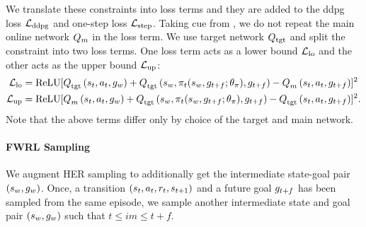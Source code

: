 We translate these constraints into loss terms and they are added to the
ddpg loss $\LossDDPG$ and one-step loss $\LossStep$.
Taking cue from \citet{MnKaSiNATURE2015}, we do
not repeat the main online network $\Q_{m}$ in the loss term. We use target
network $\Qtgt$ and split the constraint into two loss terms. One loss term acts
as a lower bound $\LossLo$ and the other acts as the upper bound $\LossUp$:
%
\begin{align}
  \LossLo &= \text{ReLU}[
      \fwargs{\state_{t}}{\act_t}{\goal_{w}}{\tgt}{}
      + \fwargs{\state_{w}}{\policy_t(\state_{w}, \goal_{t+f};\param_\policy)}{\goal_{t+f}}{\tgt}{}
      - \fwargs{\state_{t}}{\act_t}{\goal_{t+f}}{m}{}
      ]^2
                         \\
  \LossUp &= \text{ReLU}[
      \fwargs{\state_{t}}{\act_t}{\goal_{w}}{m}{}
      + \fwargs{\state_{w}}{\policy_t(\state_{w}, \goal_{t+f};\param_\policy)}{\goal_{t+f}}{\tgt}{}
      - \fwargs{\state_{t}}{\act_t}{\goal_{t+f}}{\tgt}{}
      ]^2.
\end{align}%
% 
Note that the above terms differ only by choice of the target and main network. 

\paragraph{FWRL Sampling}
We augment HER sampling to additionally get the intermediate state-goal pair
$(\state_{w}, \goal_{w})$.
Once, a transition $(\state_t, \act_t, \rew_t, \state_{t+1})$ and a
future goal $\goal_{t+f}$ has been sampled from the same episode, we sample
another intermediate state and goal pair $(\state_{w}, \goal_{w})$ such that
$t \le im \le t + f$.
% 


